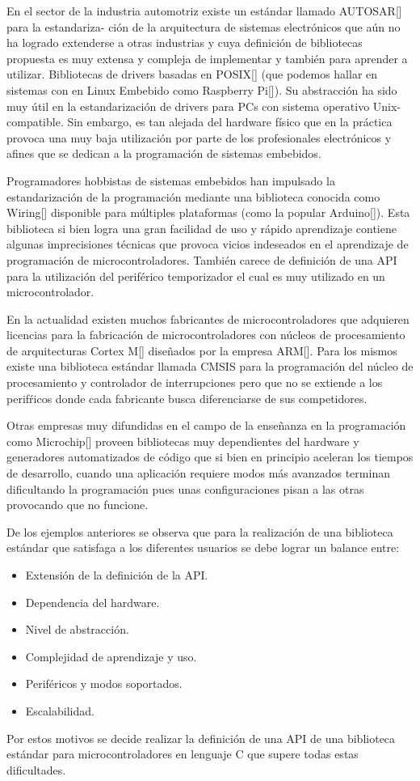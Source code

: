 En el sector de la industria automotriz existe un estándar llamado AUTOSAR[] para la estandariza- ción de la  arquitectura de sistemas electrónicos que aún no ha logrado extenderse a otras industrias y cuya definición de bibliotecas propuesta es muy extensa y compleja de implementar y también para aprender a utilizar.
Bibliotecas de drivers basadas en POSIX[] (que podemos hallar en sistemas con en Linux Embebido como Raspberry Pi[]). Su abstracción ha sido muy útil en la estandarización de drivers para PCs con sistema operativo Unix-compatible. Sin embargo, es tan alejada del hardware físico que en la práctica provoca una muy baja utilización por parte de los profesionales electrónicos y afines que se dedican a la programación de sistemas embebidos.

Programadores hobbistas de sistemas embebidos han impulsado la  estandarización de la programación mediante una biblioteca conocida como Wiring[] disponible para múltiples plataformas (como la popular Arduino[]). Esta biblioteca si bien logra una gran facilidad de uso y rápido aprendizaje contiene algunas imprecisiones técnicas que provoca vicios indeseados en el aprendizaje de programación de microcontroladores. También carece de definición de una API para la utilización del periférico temporizador el cual es muy utilizado en un microcontrolador.

En la actualidad existen muchos fabricantes de microcontroladores que adquieren licencias para la fabricación de microcontroladores con núcleos de procesamiento de arquitecturas Cortex M[] diseñados por la empresa ARM[]. Para los mismos existe una biblioteca estándar llamada CMSIS{} para la programación del núcleo de procesamiento y controlador de interrupciones pero que no se extiende a los perifŕicos donde cada fabricante busca diferenciarse de sus competidores.

Otras empresas muy difundidas en el campo de la enseñanza en la programación como Microchip[] proveen bibliotecas muy dependientes del hardware y generadores automatizados de código que si bien en principio aceleran los tiempos de desarrollo, cuando una aplicación requiere modos más avanzados terminan dificultando la programación pues unas configuraciones pisan a las otras provocando que no funcione.

De los ejemplos anteriores se observa que para la realización de una biblioteca estándar que satisfaga a los diferentes usuarios se debe lograr un balance entre:

\begin{itemize}
\item Extensión de la definición de la API.
\item Dependencia del hardware.
\item Nivel de abstracción.
\item Complejidad de aprendizaje y uso.
\item Periféricos y modos soportados.
\item Escalabilidad.
\end{itemize}



Por estos motivos se decide realizar la definición de una API de una biblioteca estándar para microcontroladores  en lenguaje C que supere todas estas dificultades.
